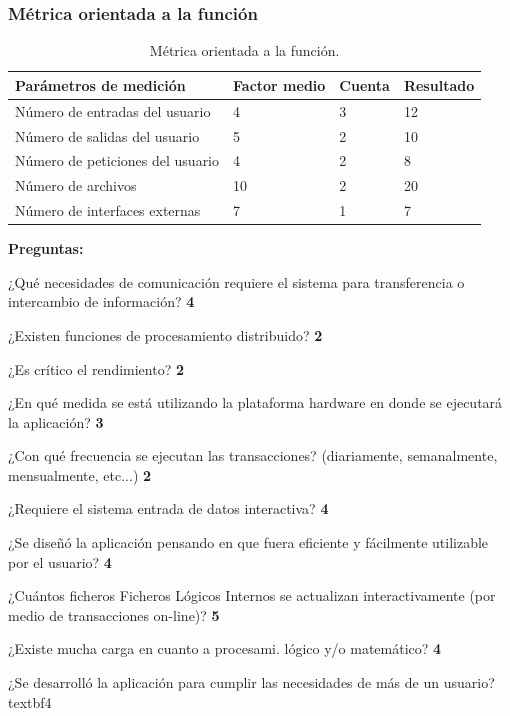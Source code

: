 \documentclass[10pt]{article}
\begin{document}
\subsubsection{Métrica orientada a la función}
\begin{table}[htbp]
\begin{center}
\begin{tabular}{|p{2.2cm}|p{2.2cm}|p{2.2cm}|p{2.2cm}|}
\hline
Parámetros de medición & Factor medio & Cuenta & Resultado  \\
\hline
Número de entradas del usuario &  4 & 3 & 12\\
\hline
Número de salidas del usuario &  5 & 2 & 10\\
\hline
Número de peticiones del usuario &  4 & 2 & 8\\
\hline
Número de archivos &  10 & 2 & 20\\
\hline
Número de interfaces externas &  7 & 1 & 7\\
\hline
\end{tabular}
\caption{Métrica orientada a la función.}
\label{tabla1}
\end{center}
\end{table}

\newpage

\textbf{Preguntas:}

¿Qué necesidades de comunicación requiere el sistema para transferencia o intercambio de información? \textbf{4}

¿Existen funciones de procesamiento distribuido?  \textbf{2}

¿Es crítico el rendimiento?  \textbf{2}

¿En qué medida se está utilizando la plataforma hardware en donde se ejecutará la aplicación? \textbf{3}

¿Con qué frecuencia se ejecutan las transacciones? (diariamente, semanalmente, mensualmente, etc...)  \textbf{2}

¿Requiere el sistema entrada de datos interactiva? \textbf{4}

¿Se diseñó la aplicación pensando en que fuera eficiente y fácilmente utilizable por el usuario?  \textbf{4}

¿Cuántos ficheros Ficheros Lógicos Internos se actualizan interactivamente (por medio de transacciones on-line)? \textbf{5}

¿Existe mucha carga en cuanto a procesami. lógico y/o matemático?  \textbf{4}

¿Se desarrolló la aplicación para cumplir las necesidades de más de un usuario?  textbf{4}
\end{document}
